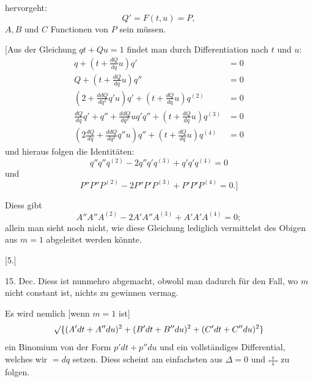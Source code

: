 %
\noindent hervorgeht:
\[
Q'=F(t,u)=P,
\]
$A,B$ und $C$ Functionen von $P$ sein müssen.

[Aus der Gleichung $qt+Qu=1$ findet man durch Differentiation nach $t$ und $u$:
\[
\begin{aligned}
q+\left(t+\frac{dQ}{dq}u\right)q'&=0\\
Q+\left(t+\frac{dQ}{dq}u\right)q''&=0\\
\left(2+\frac{ddQ}{dq^2}q'u\right)q'+\left(t+\frac{dQ}{dq}u\right)q^{(2)}&=0\\
\frac{dQ}{dq}q'+q''+\frac{ddQ}{dq^2}u q'q''+\left(t+\frac{dQ}{dq}u\right)q^{(3)}&=0\\
\left(2\frac{dQ}{dq}+\frac{ddQ}{dq^2}q''u\right)q''+\left(t+\frac{dQ}{dq}u\right)q^{(4)}&=0
\end{aligned}
\]
und hieraus folgen die Identitäten:
\[
q''q''q^{(2)}-2q''q'q^{(3)}+q'q'q^{(4)}=0
\]
und
\[
P''P''P^{(2)}-2P''P'P^{(3)}+P'P'P^{(4)}=0.]
\]
\par\indent Diess gibt
\[
A''A''A^{(2)}-2A'A''A^{(3)}+A'A'A^{(4)}=0;
\]
allein man sieht noch nicht, wie diese Gleichung lediglich vermittelst des Obigen aus $m=1$ abgeleitet werden könnte.
\begin{center}[5.]\end{center}
\noindent\hspace*{1.2em} 15. Dec. Diess ist nunmehro abgemacht, obwohl man dadurch für den Fall, wo $m$ nicht constant ist, nichts zu gewinnen vermag.

Es wird nemlich [wenn $m=1$ ist]
\[
\mathord{\surd}\{(A'dt+A''du)^2+(B'dt+B''du)^2+(C'dt+C''du)^2\}
\]
ein Binomium von der Form $p'dt+p''du$ und ein vollständiges Differential, welches wir $=dq$ setzen. Diess scheint am einfachsten aus $\Delta=0$ und $\FourRingCross$ zu folgen.

